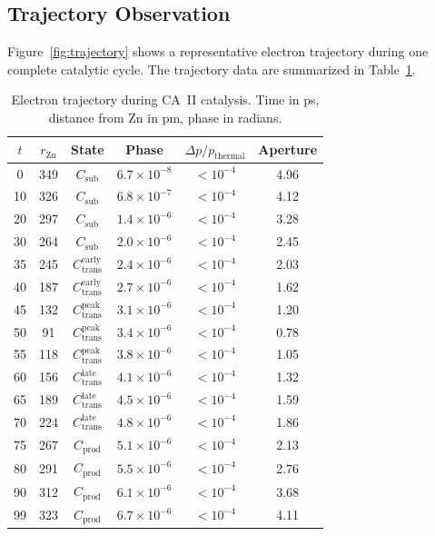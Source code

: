 \documentclass[twocolumn,amsmath,amssymb,aps,prb,superscriptaddress,longbibliography]{revtex4-2}
\begin{document}
\subsection{Trajectory Observation}

Figure~\ref{fig:trajectory} shows a representative electron trajectory during one complete catalytic cycle. The trajectory data are summarized in Table~\ref{tab:trajectory}.

\begin{table}[h]
\centering
\caption{Electron trajectory during CA~II catalysis. Time in ps, distance from Zn in pm, phase in radians.}
\label{tab:trajectory}
\begin{tabular}{cccccc}
\toprule
$t$ & $r_{\text{Zn}}$ & State & Phase & $\Delta p/p_{\text{thermal}}$ & Aperture \\
\midrule
0 & 349 & $C_{\text{sub}}$ & $6.7 \times 10^{-8}$ & $< 10^{-4}$ & 4.96 \\
10 & 326 & $C_{\text{sub}}$ & $6.8 \times 10^{-7}$ & $< 10^{-4}$ & 4.12 \\
20 & 297 & $C_{\text{sub}}$ & $1.4 \times 10^{-6}$ & $< 10^{-4}$ & 3.28 \\
30 & 264 & $C_{\text{sub}}$ & $2.0 \times 10^{-6}$ & $< 10^{-4}$ & 2.45 \\
35 & 245 & $C_{\text{trans}}^{\text{early}}$ & $2.4 \times 10^{-6}$ & $< 10^{-4}$ & 2.03 \\
40 & 187 & $C_{\text{trans}}^{\text{early}}$ & $2.7 \times 10^{-6}$ & $< 10^{-4}$ & 1.62 \\
45 & 132 & $C_{\text{trans}}^{\text{peak}}$ & $3.1 \times 10^{-6}$ & $< 10^{-4}$ & 1.20 \\
50 & 91 & $C_{\text{trans}}^{\text{peak}}$ & $3.4 \times 10^{-6}$ & $< 10^{-4}$ & 0.78 \\
55 & 118 & $C_{\text{trans}}^{\text{peak}}$ & $3.8 \times 10^{-6}$ & $< 10^{-4}$ & 1.05 \\
60 & 156 & $C_{\text{trans}}^{\text{late}}$ & $4.1 \times 10^{-6}$ & $< 10^{-4}$ & 1.32 \\
65 & 189 & $C_{\text{trans}}^{\text{late}}$ & $4.5 \times 10^{-6}$ & $< 10^{-4}$ & 1.59 \\
70 & 224 & $C_{\text{trans}}^{\text{late}}$ & $4.8 \times 10^{-6}$ & $< 10^{-4}$ & 1.86 \\
75 & 267 & $C_{\text{prod}}$ & $5.1 \times 10^{-6}$ & $< 10^{-4}$ & 2.13 \\
80 & 291 & $C_{\text{prod}}$ & $5.5 \times 10^{-6}$ & $< 10^{-4}$ & 2.76 \\
90 & 312 & $C_{\text{prod}}$ & $6.1 \times 10^{-6}$ & $< 10^{-4}$ & 3.68 \\
99 & 323 & $C_{\text{prod}}$ & $6.7 \times 10^{-6}$ & $< 10^{-4}$ & 4.11 \\
\bottomrule
\end{tabular}
\end{table}
\end{document}
